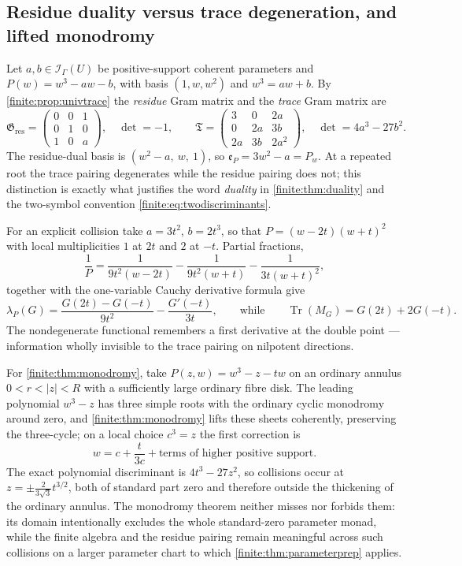 \documentclass[11pt,letterpaper]{article}
\theoremstyle{definition}
\theoremstyle{remark}
\newcommand{\Ip}{\mathscr I}
\newcommand{\Gram}{\mathfrak G}
\newcommand{\TGram}{\mathfrak T}
\newcommand{\Eul}{\mathfrak e}
\DeclareMathOperator{\Tr}{Tr}
\numberwithin{equation}{section}
\begin{document}
\subsection{Residue duality versus trace degeneration, and lifted monodromy}
\label{finite:sec:cubic}

Let $a,b\in\Ip_\Gamma(U)$ be positive-support coherent parameters and $P(w)=w^3-aw-b$, with basis $(1,w,w^2)$ and $w^3=aw+b$. By \cref{finite:prop:univtrace} the \emph{residue} Gram matrix and the \emph{trace} Gram matrix are
\begin{equation}\label{finite:eq:cubicgrams}
 \Gram_{\mathrm{res}}=\begin{pmatrix}0&0&1\\0&1&0\\1&0&a\end{pmatrix},
 \quad\det=-1,
 \qquad
 \TGram=\begin{pmatrix}3&0&2a\\0&2a&3b\\2a&3b&2a^2\end{pmatrix},
 \quad\det=4a^3-27b^2 .
\end{equation}
The residue-dual basis is $(w^2-a,\ w,\ 1)$, so $\Eul_P=3w^2-a=P_w$. At a repeated root the trace pairing degenerates while the residue pairing does not; this distinction is exactly what justifies the word \emph{duality} in \cref{finite:thm:duality} and the two-symbol convention \eqref{finite:eq:twodiscriminants}.

For an explicit collision take $a=3t^2$, $b=2t^3$, so that $P=(w-2t)(w+t)^2$ with local multiplicities $1$ at $2t$ and $2$ at $-t$. Partial fractions,
\[
 \frac1P=\frac1{9t^2(w-2t)}-\frac1{9t^2(w+t)}-\frac1{3t(w+t)^2},
\]
together with the one-variable Cauchy derivative formula give
\begin{equation}\label{finite:eq:doublepolelambda}
 \lambda_P(G)=\frac{G(2t)-G(-t)}{9t^2}-\frac{G'(-t)}{3t},
 \qquad\text{while}\qquad
 \Tr(M_G)=G(2t)+2G(-t).
\end{equation}
The nondegenerate functional remembers a first derivative at the double point --- information wholly invisible to the trace pairing on nilpotent directions.

For \cref{finite:thm:monodromy}, take $P(z,w)=w^3-z-tw$ on an ordinary annulus $0<r<|z|<R$ with a sufficiently large ordinary fibre disk. The leading polynomial $w^3-z$ has three simple roots with the ordinary cyclic monodromy around zero, and \cref{finite:thm:monodromy} lifts these sheets coherently, preserving the three-cycle; on a local choice $c^3=z$ the first correction is
\[
 w=c+\frac t{3c}+\text{terms of higher positive support}.
\]
The exact polynomial discriminant is $4t^3-27z^2$, so collisions occur at $z=\pm\tfrac2{3\sqrt3}t^{3/2}$, both of standard part zero and therefore outside the thickening of the ordinary annulus. The monodromy theorem neither misses nor forbids them: its domain intentionally excludes the whole standard-zero parameter monad, while the finite algebra and the residue pairing remain meaningful across such collisions on a larger parameter chart to which \cref{finite:thm:parameterprep} applies.
\end{document}

